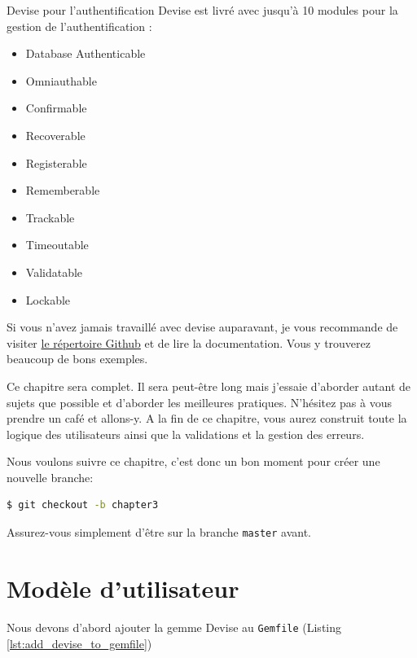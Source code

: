 \documentclass[]{report}
\begin{document}
  \begin{tcolorbox}{Devise pour l'authentification}\label{box:devise_for_authentication}
    Devise est livré avec jusqu'à 10 modules pour la gestion de l'authentification :

    \begin{itemize}
      \item Database Authenticable
      \item Omniauthable
      \item Confirmable
      \item Recoverable
      \item Registerable
      \item Rememberable
      \item Trackable
      \item Timeoutable
      \item Validatable
      \item Lockable
    \end{itemize}

    Si vous n'avez jamais travaillé avec devise auparavant, je vous recommande de visiter \href{https://github.com/plataformatec/devise}{le répertoire Github} et de lire la documentation. Vous y trouverez beaucoup de bons exemples.
  \end{tcolorbox}

  Ce chapitre sera complet. Il sera peut-être long mais j'essaie d'aborder autant de sujets que possible et d'aborder les meilleures pratiques. N'hésitez pas à vous prendre un café et allons-y. A la fin de ce chapitre, vous aurez construit toute la logique des utilisateurs ainsi que la validations et la gestion des erreurs.

  Nous voulons suivre ce chapitre, c'est donc un bon moment pour créer une nouvelle branche:

  \begin{scriptsize}
  \begin{lstlisting}[language=bash]
  $ git checkout -b chapter3
  \end{lstlisting}
  \end{scriptsize}

  Assurez-vous simplement d'être sur la branche \verb|master| avant.

  \section{Modèle d'utilisateur}

    Nous devons d'abord ajouter la gemme Devise au \verb|Gemfile| (Listing \ref{lst:add_devise_to_gemfile})
\end{document}
